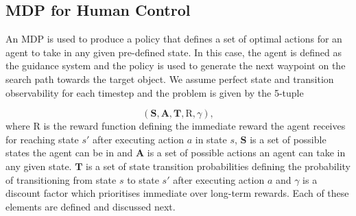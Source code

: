 \documentclass[a4paper, twoside]{article}
\begin{document}



\subsection{MDP for Human Control}

\noindent An MDP is used to produce a policy that defines a set of optimal actions for an agent to take in any given pre-defined state. In this case, the agent is defined as the guidance system and the policy is used to generate the next waypoint on the search path towards the target object. We assume perfect state and transition observability for each timestep and the problem is given by the 5-tuple

\begin{equation}
  (\mathbf{S}, \mathbf{A}, \mathbf{T}, \text{R}, \gamma), 
\end{equation}
where $\text{R}$ is the reward function defining the immediate reward the agent receives for reaching state $s'$ after executing action $a$ in state $s$, $\mathbf{S}$ is a set of possible states the agent can be in and $\mathbf{A}$ is a set of possible actions an agent can take in any given state. $\mathbf{T}$ is a set of state transition probabilities defining the probability of transitioning from state $s$ to state $s'$ after executing action $a$ and $\gamma$ is a discount factor which prioritises immediate over long-term rewards. Each of these elements are defined and discussed next.
\end{document}
